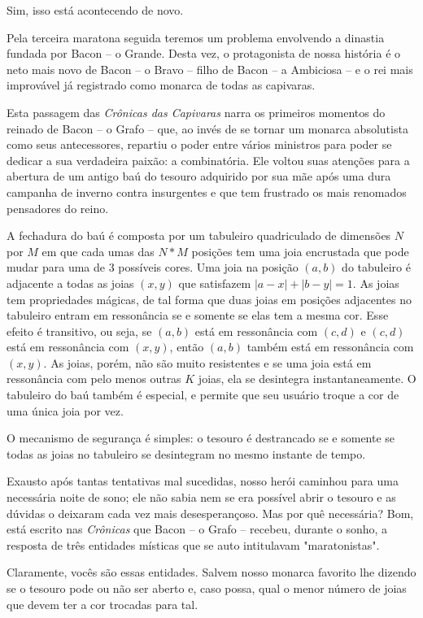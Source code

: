 Sim, isso está acontecendo de novo.

Pela terceira maratona seguida teremos um problema envolvendo a dinastia fundada por Bacon -- o Grande.
Desta vez, o protagonista de nossa história é o neto mais novo de Bacon -- o Bravo -- filho de Bacon -- a Ambiciosa -- e o rei mais improvável já registrado como monarca de todas as capivaras.

Esta passagem das \textit{Crônicas das Capivaras} narra os primeiros momentos do reinado de Bacon -- o Grafo -- que, ao invés de se tornar um monarca absolutista como seus antecessores, repartiu o poder entre vários ministros para poder se dedicar a sua verdadeira paixão: a combinatória.
Ele voltou suas atenções para a abertura de um antigo baú do tesouro adquirido por sua mãe após uma dura campanha de inverno contra insurgentes e que tem frustrado os mais renomados pensadores do reino.

A fechadura do baú é composta por um tabuleiro quadriculado de dimensões $N$ por $M$ em que cada umas das $N*M$ posições tem uma joia encrustada que pode mudar para uma de $3$ possíveis cores.
Uma joia na posição $(a,b)$ do tabuleiro é adjacente a todas as joias $(x,y)$ que satisfazem $|a - x| + |b - y| = 1$.
As joias tem propriedades mágicas, de tal forma que duas joias em posições adjacentes no tabuleiro entram em ressonância se e somente se elas tem a mesma cor.
Esse efeito é transitivo, ou seja, se $(a,b)$ está em ressonância com $(c,d)$ e $(c,d)$ está em ressonância com $(x,y)$, então $(a,b)$ também está em ressonância com $(x,y)$.
As joias, porém, não são muito resistentes e se uma joia está em ressonância com pelo menos outras $K$ joias, ela se desintegra instantaneamente.
O tabuleiro do baú também é especial, e permite que seu usuário troque a cor de uma única joia por vez.

O mecanismo de segurança é simples: o tesouro é destrancado se e somente se todas as joias no tabuleiro se desintegram no mesmo instante de tempo.

Exausto após tantas tentativas mal sucedidas, nosso herói caminhou para uma necessária noite de sono; ele não sabia nem se era possível abrir o tesouro e as dúvidas o deixaram cada vez mais desesperançoso.
Mas por quê necessária?
Bom, está escrito nas \textit{Crônicas} que Bacon -- o Grafo -- recebeu, durante o sonho, a resposta de três entidades místicas que se auto intitulavam "maratonistas".

Claramente, vocês são essas entidades. Salvem nosso monarca favorito lhe dizendo se o tesouro pode ou não ser aberto e, caso possa, qual o menor número de joias que devem ter a cor trocadas para tal.


